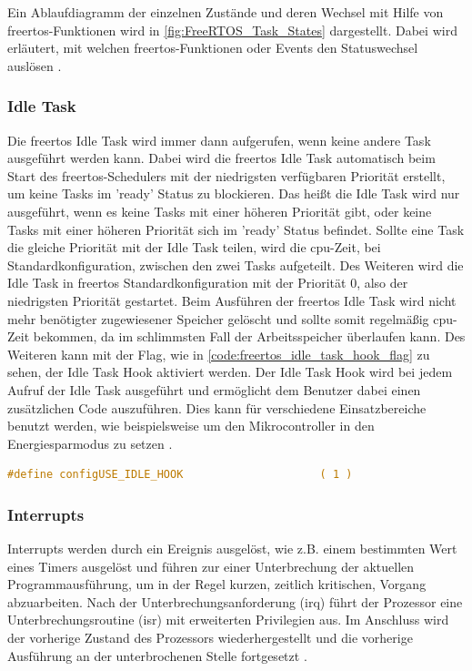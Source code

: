 \documentclass[../EDF Master Thesis.tex]{subfiles}
\begin{document}
Ein Ablaufdiagramm der einzelnen Zustände und deren Wechsel mit Hilfe von \ac{freertos}-Funktionen wird in \autoref{fig:FreeRTOS_Task_States} dargestellt.
Dabei wird erläutert, mit welchen \ac{freertos}-Funktionen oder Events den Statuswechsel auslösen \autocite{freertos-task-states}.

\subsubsection{Idle Task} \label{section:idle_task}
Die \ac{freertos} Idle Task wird immer dann aufgerufen, wenn keine andere Task ausgeführt werden kann.
Dabei wird die \ac{freertos} Idle Task automatisch beim Start des \ac{freertos}-Schedulers mit der niedrigsten verfügbaren Priorität erstellt, um keine Tasks im 'ready' Status zu blockieren.
Das heißt die Idle Task wird nur ausgeführt, wenn es keine Tasks mit einer höheren Priorität gibt, oder keine Tasks mit einer höheren Priorität sich im 'ready' Status befindet.
Sollte eine Task die gleiche Priorität mit der Idle Task teilen, wird die \ac{cpu}-Zeit, bei Standardkonfiguration, zwischen den zwei Tasks aufgeteilt.
Des Weiteren wird die Idle Task in \ac{freertos} Standardkonfiguration mit der Priorität 0, also der niedrigsten Priorität gestartet.
Beim Ausführen der \ac{freertos} Idle Task wird nicht mehr benötigter zugewiesener Speicher gelöscht und sollte somit regelmäßig \ac{cpu}-Zeit bekommen, da im schlimmsten Fall der Arbeitsspeicher überlaufen kann.
Des Weiteren kann mit der Flag, wie in \autoref{code:freertos_idle_task_hook_flag} zu sehen, der Idle Task Hook aktiviert werden.
Der Idle Task Hook wird bei jedem Aufruf der Idle Task ausgeführt und ermöglicht dem Benutzer dabei einen zusätzlichen Code auszuführen.
Dies kann für verschiedene Einsatzbereiche benutzt werden, wie beispielsweise um den Mikrocontroller in den Energiesparmodus zu setzen \autocite{freertos_idle_task}.

\begin{lstlisting}[language=C, caption=FreeRTOS Idle Task Hook Flag, label=code:freertos_idle_task_hook_flag]
    #define configUSE_IDLE_HOOK                     ( 1 )
\end{lstlisting}


\subsubsection{Interrupts} \label{section:interrupts}
Interrupts werden durch ein Ereignis ausgelöst, wie z.B. einem bestimmten Wert eines Timers ausgelöst und führen zur einer Unterbrechung der aktuellen Programmausführung, um in der Regel kurzen, zeitlich kritischen, Vorgang abzuarbeiten.
Nach der Unterbrechungsanforderung (\ac{irq}) führt der Prozessor eine Unterbrechungsroutine (\ac{isr}) mit erweiterten Privilegien aus.
Im Anschluss wird der vorherige Zustand des Prozessors wiederhergestellt und die vorherige Ausführung an der unterbrochenen Stelle fortgesetzt \parencite{grundkurs_betriebssysteme, wiki:008}.
\end{document}
